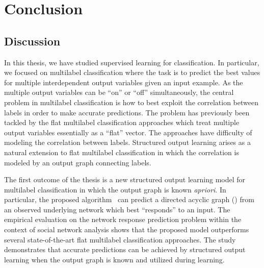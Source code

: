 {%
%
%
\chapter{Conclusion} \label{ch_conclusion}


\section{Discussion}

In this thesis, we have studied supervised learning for classification.
In particular, we focused on multilabel classification where the task is to predict the best values for multiple interdependent output variables given an input example.
As the multiple output variables can be ``on'' or ``off'' simultaneously, the central problem in multilabel classification is how to best exploit the correlation between labels in order to make accurate predictions.
The problem has previously been tackled by the flat multilabel classification approaches which treat multiple output variables essentially as a ``flat'' vector.
The approaches have difficulty of modeling the correlation between labels.
Structured output learning arises as a natural extension to flat multilabel classification in which the correlation is modeled by an output graph connecting labels.

The first outcome of the thesis is a new structured output learning model for multilabel classification in which the output graph is known \textit{apriori}.
In particular, the proposed algorithm \spin\ can predict a directed acyclic graph (\daggraph) from an observed underlying network which best ``responds'' to an input.
The empirical evaluation on the network response prediction problem within the context of social network analysis shows that the proposed model outperforms several state-of-the-art flat multilabel classification approaches.
The study demonstrates that accurate predictions can be achieved by structured output learning when the output graph is known and utilized during learning.

}
